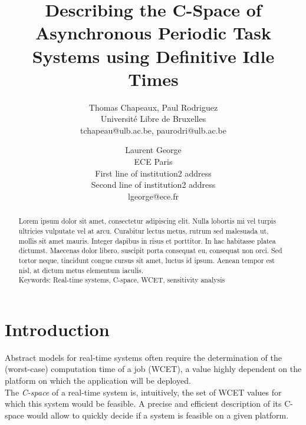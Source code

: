 \documentclass[times, 10pt,twocolumn, a4paper]{article}
\begin{document}
\title{Describing the C-Space of Asynchronous Periodic Task Systems using
Definitive Idle Times}

\author{Thomas Chapeaux, Paul Rodriguez\\
Universit\'e Libre de Bruxelles\\ tchapeau@ulb.ac.be, paurodri@ulb.ac.be \\
\and
Laurent George\\
ECE Paris\\
First line of institution2 address\\ Second line of institution2 address\\
lgeorge@ece.fr\\
}

\maketitle
\thispagestyle{empty}

\begin{abstract}
	Lorem ipsum dolor sit amet, consectetur adipiscing elit. Nulla lobortis mi vel
turpis ultricies vulputate vel at arcu. Curabitur lectus metus, rutrum sed malesuada ut, mollis sit amet mauris. Integer dapibus in risus et porttitor. In hac habitasse platea dictumst. Maecenas dolor libero, suscipit porta consequat eu, consequat non orci. Sed tortor neque, tincidunt congue cursus sit amet, luctus id ipsum. Aenean tempor est nisl, at dictum metus elementum iaculis.\\

Keywords: Real-time systems, C-space, WCET, sensitivity analysis
\end{abstract}



\section{Introduction}

	Abstract models for real-time systems often require the determination of the
	(worst-case) computation time of a job (WCET), a value highly dependent on the
	platform on which the application will be deployed.\\

	The \emph{C-space} of a real-time system is, intuitively,
	the set of WCET values for which this system would be feasible. A
	precise and efficient description of its C-space would allow to quickly decide
	if a system is feasible on a given platform.\\
\end{document}

